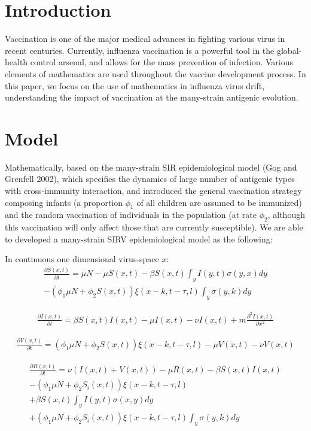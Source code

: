 \documentclass[preprint,12pt]{elsarticle}
\begin{document}
\section{Introduction}
Vaccination is one of the major medical advances in fighting various virus in recent centuries. 
Currently, influenza vaccination is a powerful tool in the global-health control arsenal, and allows for the mass prevention of infection.
Various elements of mathematics are used throughout the vaccine development process.
In this paper, we focus on the use of mathematics in influenza virus drift, understanding the impact of vaccination at the many-strain antigenic evolution. 

\section{Model}
Mathematically, based on the many-strain SIR epidemiological model (Gog and Grenfell 2002), which specifies the dynamics of large number of antigenic types with cross-immunity interaction, and introduced the general vaccination strategy composing infants (a proportion \(\phi_{1}\) of all children are assumed to be immunized) and the random vaccination of individuals in the population (at rate \(\phi_{2}\), although this vaccination will only affect those that are currently susceptible).
We are able to developed a many-strain SIRV epidemiological model as the following:

\newpage
In continuous one dimensional virus-space \(x\):
\begin{align}
  \label{eq:S}
  \frac{\partial S(x,t)}{\partial t} = \mu N - \mu S(x,t) - \beta S(x,t) \int_{y} I(y,t)\sigma(y,x) dy
 \nonumber\\
  -(\phi_{1}\mu N + \phi_{2} S(x,t)) \xi(x-k, t-\tau, l) \int_{y} \sigma(y,k) dy
\end{align}

\begin{align}
  \label{eq:I}
  \frac{\partial I(x,t)}{\partial t} = \beta S(x,t) I(x,t) - \mu I(x,t) - \nu I(x,t) + m \frac{\partial^2I(x,t)}{\partial x^2}
\end{align}

\begin{align}
  \label{eq:V}
  \frac{\partial V(x,t)}{\partial t} = (\phi_{1}\mu N + \phi_{2} S(x,t)) \xi(x-k, t-\tau, l)  - \mu V(x,t) - \nu V(x,t)
\end{align}

\begin{align}
  \label{eq:R}
  \frac{\partial R(x,t)}{\partial t} = \nu (I(x,t) + V(x,t)) - \mu R(x,t) - \beta S(x,t) I(x,t) 
   \nonumber\\
   -(\phi_{1}\mu N + \phi_{2} S_i(x,t)) \xi(x-k, t-\tau, l)
  \nonumber\\
  +\beta S(x,t)\int_{y} I(y,t)\sigma(x,y) dy
  \nonumber\\
  +(\phi_{1}\mu N + \phi_{2} S_i(x,t)) \xi(x-k, t-\tau, l) \int_{y} \sigma(y,k) dy
\end{align}
\end{document}
